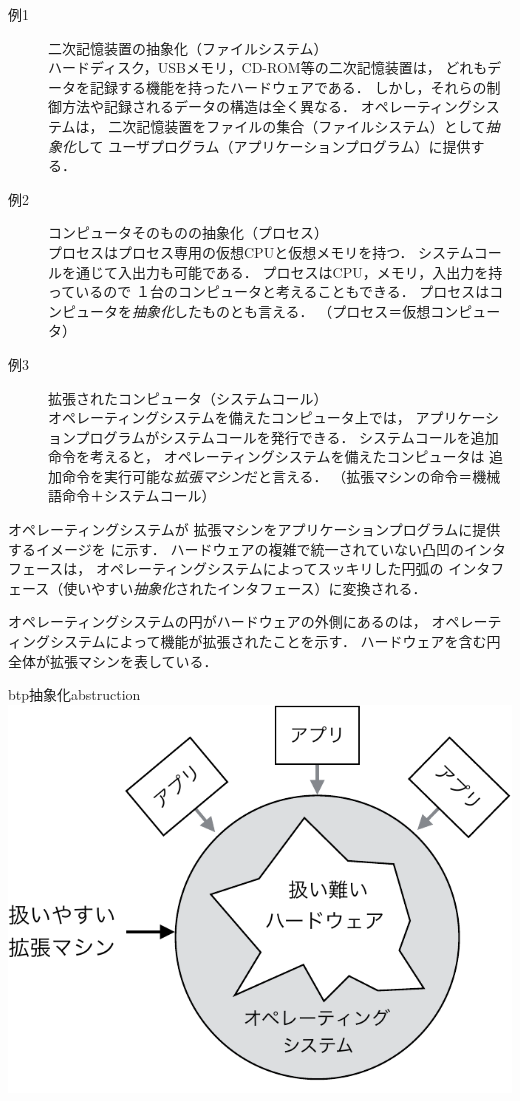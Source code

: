 \begin{description}
\item[例1] 二次記憶装置の抽象化（ファイルシステム） \\
  ハードディスク，USBメモリ，CD-ROM等の二次記憶装置は，
  どれもデータを記録する機能を持ったハードウェアである．
  しかし，それらの制御方法や記録されるデータの構造は全く異なる．
  オペレーティングシステムは，
  二次記憶装置をファイルの集合（ファイルシステム）として\emph{抽象化}して
  ユーザプログラム（アプリケーションプログラム）に提供する．

\item[例2] コンピュータそのものの抽象化（プロセス） \\
  プロセスはプロセス専用の仮想CPUと仮想メモリを持つ．
  システムコールを通じて入出力も可能である．
  プロセスはCPU，メモリ，入出力を持っているので
  １台のコンピュータと考えることもできる．
  プロセスはコンピュータを\emph{抽象化}したものとも言える．
  （プロセス＝仮想コンピュータ）

\item[例3] 拡張されたコンピュータ（システムコール） \\
  オペレーティングシステムを備えたコンピュータ上では，
  アプリケーションプログラムがシステムコールを発行できる．
  システムコールを追加命令を考えると，
  オペレーティングシステムを備えたコンピュータは
  追加命令を実行可能な\emph{拡張マシン}だと言える．
  （拡張マシンの命令＝機械語命令＋システムコール）
\end{description}

オペレーティングシステムが
拡張マシンをアプリケーションプログラムに提供するイメージを
に示す．
ハードウェアの複雑で統一されていない凸凹のインタフェースは，
オペレーティングシステムによってスッキリした円弧の
インタフェース（使いやすい\emph{抽象化}されたインタフェース）に変換される．

オペレーティングシステムの円がハードウェアの外側にあるのは，
オペレーティングシステムによって機能が拡張されたことを示す．
ハードウェアを含む円全体が拡張マシンを表している．

\begin{myfig}{btp}{抽象化}{abstruction}
  \includegraphics[scale=0.66]{Fig/abstruction-crop.pdf}
\end{myfig}

